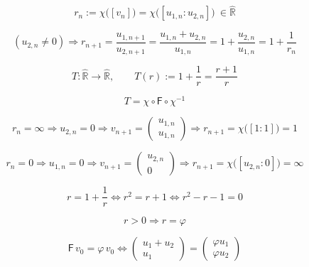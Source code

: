 \documentclass[12pt]{article}
\begin{document}
\begin{equation}
r_n:=\chi\bigl([v_n]\bigr)
=\chi\bigl([u_{1,n}:u_{2,n}]\bigr)
\ \in\widehat{\mathbb{R}}
\end{equation}

\begin{equation}
(u_{2,n}\neq 0)\Longrightarrow
r_{n+1}
=\frac{u_{1,n+1}}{u_{2,n+1}}
=\frac{u_{1,n}+u_{2,n}}{u_{1,n}}
=1+\frac{u_{2,n}}{u_{1,n}}
=1+\frac{1}{r_n}
\end{equation}

\begin{equation}
T:\widehat{\mathbb{R}}\to\widehat{\mathbb{R}},\qquad
T(r):=1+\frac{1}{r}=\frac{r+1}{r}
\end{equation}

\begin{equation}
T=\chi\circ\mathsf{F}\circ\chi^{-1}
\end{equation}

\begin{equation}
r_n=\infty
\Longrightarrow
u_{2,n}=0
\Longrightarrow
v_{n+1}=\begin{pmatrix}u_{1,n}\\[2pt]u_{1,n}\end{pmatrix}
\Longrightarrow
r_{n+1}=\chi\bigl([1:1]\bigr)=1
\end{equation}

\begin{equation}
r_n=0
\Longrightarrow
u_{1,n}=0
\Longrightarrow
v_{n+1}=\begin{pmatrix}u_{2,n}\\[2pt]0\end{pmatrix}
\Longrightarrow
r_{n+1}=\chi\bigl([u_{2,n}:0]\bigr)=\infty
\end{equation}

\begin{equation}
r=1+\frac{1}{r}
\Longleftrightarrow
r^2=r+1
\Longleftrightarrow
r^2-r-1=0
\end{equation}

\begin{equation}
r>0\Longrightarrow r=\varphi
\end{equation}

\begin{equation}
\mathsf{F}\,v_0=\varphi\,v_0
\Longleftrightarrow
\begin{pmatrix}u_1+u_2\\[2pt]u_1\end{pmatrix}
=
\begin{pmatrix}\varphi u_1\\[2pt]\varphi u_2\end{pmatrix}
\end{equation}
\end{document}
